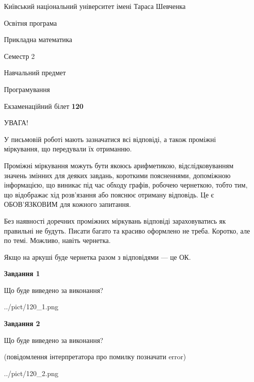 \documentclass[12pt, ukrainian]{article}
\begin{document}
{{\begin {small}\par
{ \center  Київський національний університет імені Тараса Шевченка \par}
{\parbox {5 cm}{Освітня програма \hfill}{\parbox {7 cm}{Прикладна математика\hfill}}\parbox {6 cm}{\hfill Семестр 2}}\par
{\parbox {5 cm} {Навчальний предмет \hfill}\parbox {7 cm}{Програмування \hfill}\parbox {6cm}{\hfill}\par}\vspace{-7pt} \end{small}}{\center Екзаменаційний білет \No \textbf
{ 120 }\par}}
{
\begin {large}
УВАГА!

У письмовій роботі мають зазначатися всі відповіді, а також проміжні міркування, що передували їх отриманню.

Проміжні міркування можуть бути якоюсь арифметикою, відслідковуванням зна\-чень змінних для деяких завдань,
короткими поясненнями, допоміжною інформацією, що виникає під час обходу графів, робочею чернеткою,
тобто тим, що відображає хід розв’язання або пояснює отриману відповідь.
Це є ОБОВ’ЯЗКОВИМ для кожного запитання.

Без наявності доречних проміжних міркувань відповіді зараховуватись як правиль\-ні не будуть.
Писати багато та красиво оформлено не треба. Коротко, але по темі. Можли\-во, навіть чернетка.

Якщо на аркуші буде чернетка разом з відповідями --- це ОК.

\newpage

{\begin {center}\textbf{Завдання 1}\end {center}}\par
Що буде виведено за виконання?\par
\begin{center}
	{../pict/120_1.png}
\end{center}
\newpage

{\begin {center}\textbf{Завдання 2}\end {center}}\par
Що буде виведено за виконання?\par
 (повідомлення інтерпретатора про помилку позначати error)\par
\begin{center}
	{../pict/120_2.png}
\end{center}
\newpage


\end{large}}
\end{document}
